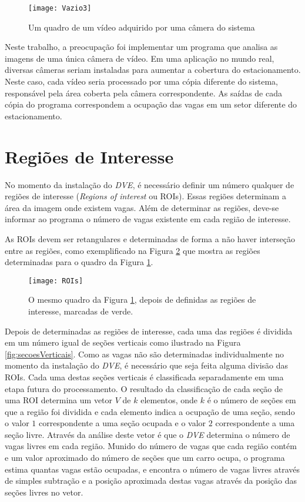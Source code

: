 \begin{figure}[!ht]
	\centering
	\texttt{[image: Vazio3]}
	\caption{Um quadro de um vídeo adquirido por uma câmera do sistema}
	\label{fig:aquisicao}
	\centering
\end{figure}

Neste trabalho, a preocupação foi implementar um programa que analisa as imagens de uma única câmera de vídeo. Em uma aplicação no mundo real, diversas câmeras seriam instaladas para aumentar a cobertura do estacionamento. Neste caso, cada vídeo seria processado por uma cópia diferente do sistema, responsável pela área coberta pela câmera correspondente. As saídas de cada cópia do programa correspondem a ocupação das vagas em um setor diferente do estacionamento.

\section{Regiões de Interesse}\label{sec:ROIs}

No momento da instalação do \textit{DVE}, é necessário definir um número qualquer de regiões de interesse (\textit{Regions of interest} ou ROIs). Essas regiões determinam a área da imagem onde existem vagas. Além de determinar as regiões, deve-se informar ao programa o número de vagas existente em cada região de interesse.

As ROIs devem ser retangulares e determinadas de forma a não haver interseção entre as regiões, como exemplificado na Figura \ref{fig:ROIs} que mostra as regiões determinadas para o quadro da Figura \ref{fig:aquisicao}.

\begin{figure}
	\centering
	\texttt{[image: ROIs]}
	\caption{O mesmo quadro da Figura \ref{fig:aquisicao}, depois de definidas as regiões de interesse, marcadas de verde.}
	\label{fig:ROIs}
	\centering
\end{figure}

Depois de determinadas as regiões de interesse, cada uma das regiões é dividida em um número igual de seções verticais como ilustrado na Figura \ref{fig:secoesVerticais}. Como as vagas não são determinadas individualmente no momento da instalação do \textit{DVE}, é necessário que seja feita alguma divisão das ROIs. Cada uma destas seções verticais é classificada separadamente em uma etapa futura do processamento. O resultado da classificação de cada seção de uma ROI determina um vetor $V$ de $k$ elementos, onde $k$ é o número de seções em que a região foi dividida e cada elemento indica a ocupação de uma seção, sendo o valor $1$ correspondente a uma seção ocupada e o valor $2$ correspondente a uma seção livre. Através da análise deste vetor é que o \textit{DVE} determina o número de vagas livres em cada região. Munido do número de vagas que cada região contém e um valor aproximado do número de seções que um carro ocupa, o programa estima quantas vagas estão ocupadas, e encontra o número de vagas livres através de simples subtração e a posição aproximada destas vagas através da posição das seções livres no vetor.

